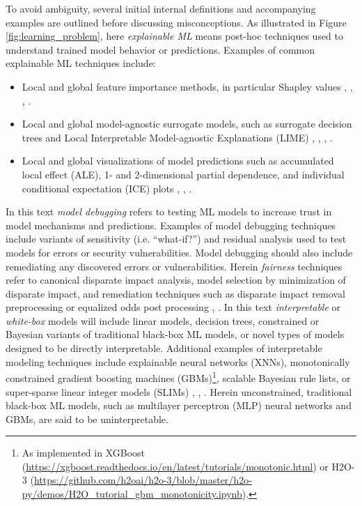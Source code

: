 \documentclass[fleqn]{article}
\begin{document}
To avoid ambiguity, several initial internal definitions and accompanying examples are outlined before discussing misconceptions. As illustrated in Figure \ref{fig:learning_problem}, here \textit{explainable ML} means post-hoc techniques used to understand trained model behavior or predictions. Examples of common explainable ML techniques include:

\begin{itemize}
\item Local and global feature importance methods, in particular Shapley values \cite{shapley1988shapley}, \cite{keinan2004fair}, \cite{kononenko2010efficient}, \cite{shapley}.
\item Local and global model-agnostic surrogate models, such as surrogate decision trees and Local Interpretable Model-agnostic Explanations (LIME) \cite{dt_surrogate1}, \cite{dt_surrogate2}, \cite{lime-sup}, \cite{lime}. 
\item Local and global visualizations of model predictions such as accumulated local effect (ALE), 1- and 2-dimensional partial dependence, and individual conditional expectation (ICE) plots \cite{ale_plot}, \cite{esl}, \cite{ice_plots}.
\end{itemize}  

\noindent In this text \textit{model debugging} refers to testing ML models to increase trust in model mechanisms and predictions. Examples of model debugging techniques include variants of sensitivity (i.e. ``what-if?'') and residual analysis used to test models for errors or security vulnerabilities. Model debugging should also include remediating any discovered errors or vulnerabilities. Herein \textit{fairness} techniques refer to canonical disparate impact analysis, model selection by minimization of disparate impact, and remediation techniques such as disparate impact removal preprocessing or equalized odds post processing \cite{feldman2015certifying}, \cite{hardt2016equality}. In this text \textit{interpretable} or \textit{white-box} models will include linear models, decision trees, constrained or Bayesian variants of traditional black-box ML models, or novel types of models designed to be directly interpretable. Additional examples of interpretable modeling techniques include explainable neural networks (XNNs), monotonically constrained gradient boosting machines (GBMs)\footnote{As implemented in XGBoost (\url{https://xgboost.readthedocs.io/en/latest/tutorials/monotonic.html}) or H2O-3 (\url{https://github.com/h2oai/h2o-3/blob/master/h2o-py/demos/H2O_tutorial_gbm_monotonicity.ipynb}).}, scalable Bayesian rule lists, or super-sparse linear integer models (SLIMs) \cite{wf_xnn}, \cite{sbrl}, \cite{slim}. Herein unconstrained, traditional black-box ML models, such as multilayer perceptron (MLP) neural networks and GBMs, are said to be uninterpretable. 
\end{document}
